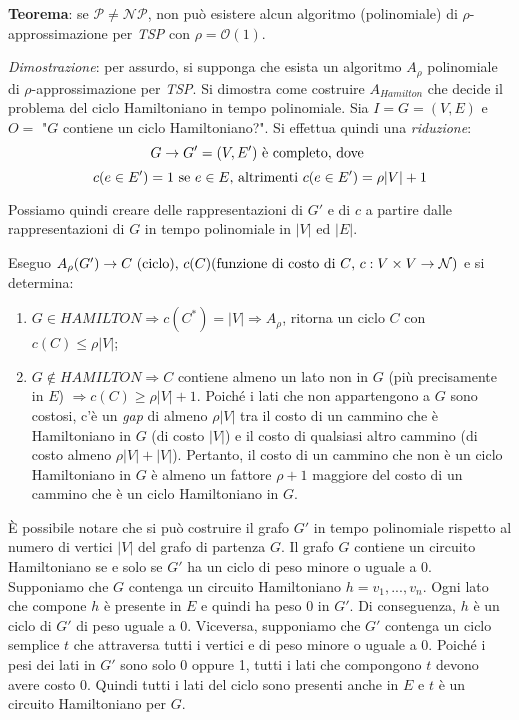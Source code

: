 \textbf{Teorema}: se $\mathcal{P} \ne \mathcal{NP}$, non può esistere alcun algoritmo
(polinomiale) di $\rho$-approssimazione per \textit{TSP} con $\rho = \mathcal{O}(1)$.

\textit{Dimostrazione}: per assurdo, si supponga che esista un algoritmo $A_\rho$
polinomiale di $\rho$-approssimazione per \textit{TSP}. Si dimostra come costruire $A_{Hamilton}$
che decide il problema del ciclo Hamiltoniano in tempo polinomiale. Sia $I = G =(V,E)$
e $O = $ "$G$ contiene un ciclo Hamiltoniano?". Si effettua quindi una \textit{riduzione}:
\[
    G \rightarrow G' = (V, E') \textnormal{ è completo, dove }
\]
\[
    c(e \in E') = 1 \textnormal{ se } e \in E \textnormal{, altrimenti } c(e \in E') = \rho|V| + 1
\]

Possiamo quindi creare delle rappresentazioni di $G'$ e di $c$ a partire dalle rappresentazioni
di $G$ in tempo polinomiale in $|V|$ ed $|E|$.

Eseguo $A_\rho(G') \rightarrow C \textnormal{ (ciclo), } c(C) \textnormal{(funzione di costo di $C$, $c: V \times V \rightarrow \mathcal{N}$)}$ e si
determina:
\begin{enumerate}
\item $G \in HAMILTON \Rightarrow c(C^*) = |V| \Rightarrow A_\rho$, ritorna un ciclo $C$
con $c(C) \le \rho|V|$;
\item $G \not\in HAMILTON \Rightarrow C$ contiene almeno un lato non in
$G$ (più precisamente in $E$) $\Rightarrow c(C) \ge \rho|V| + 1$. Poiché i lati che non
appartengono a $G$ sono costosi, c'è un \textit{gap} di almeno $\rho |V|$ tra il costo di un cammino
che è Hamiltoniano in $G$ (di costo $|V|$) e il costo di qualsiasi altro cammino (di costo
almeno $\rho |V| + |V|$). Pertanto, il costo di un cammino che non è un ciclo Hamiltoniano
in $G$ è almeno un fattore $\rho + 1$ maggiore del costo di un cammino che è un ciclo
Hamiltoniano in $G$.
\end{enumerate}

È possibile notare che si può costruire il grafo $G'$ in tempo polinomiale rispetto al numero
di vertici $|V|$ del grafo di partenza $G$. Il grafo $G$ contiene un circuito Hamiltoniano se e
solo se $G'$ ha un ciclo di peso minore o uguale a 0. Supponiamo che $G$ contenga un circuito
Hamiltoniano $h = v_1, ..., v_n$. Ogni lato che compone $h$ è presente in $E$ e quindi ha peso 0 in $G'$.
Di conseguenza, $h$ è un ciclo di $G'$ di peso uguale a 0. Viceversa, supponiamo che $G'$ contenga un ciclo
semplice $t$ che attraversa tutti i vertici e di peso minore o uguale a 0. Poiché i pesi dei lati
in $G'$ sono solo 0 oppure 1, tutti i lati che compongono $t$ devono avere costo 0. Quindi tutti i
lati del ciclo sono presenti anche in $E$ e $t$ è un circuito Hamiltoniano per $G$. \square


